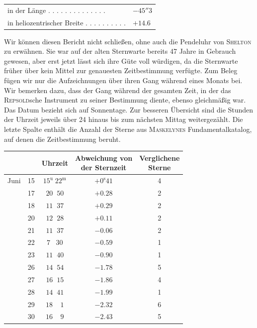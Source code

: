 \begin{center}
\begin{tabular}{ll}
in der Länge . . . . . . . . . . . . . . & $-45''3$ \\
in heliozentrischer Breite . . . . . . . . . . & $+14.6$ \\
\end{tabular}
\end{center}

\par\indent Wir können diesen Bericht nicht schließen, ohne auch die Pendeluhr von \textsc{Shelton} zu erwähnen. Sie war auf der alten Sternwarte bereits 47 Jahre in Gebrauch gewesen, aber erst jetzt lässt sich ihre Güte voll würdigen, da die Sternwarte früher über kein Mittel zur genauesten Zeitbestimmung verfügte. Zum Beleg fügen wir nur die Aufzeichnungen über ihren Gang während eines Monats bei. Wir bemerken dazu, dass der Gang während der gesamten Zeit, in der das \textsc{Repsold}sche Instrument zu seiner Bestimmung diente, ebenso gleichmäßig war. Das Datum bezieht sich auf Sonnentage. Zur besseren Übersicht sind die Stunden der Uhrzeit jeweils über 24 hinaus bis zum nächsten Mittag weitergezählt. Die letzte Spalte enthält die Anzahl der Sterne aus \textsc{Maskelynes} Fundamentalkatalog, auf denen die Zeitbestimmung beruht.

\begin{center}
\begin{tabular}{ll|c|c|c}
 & & Uhrzeit & \shortstack{Abweichung von\\der Sternzeit} & \shortstack{Verglichene\\Sterne} \\
\hline
Juni & 15 & $15^{\mathrm u}\;22^{\mathrm m}$ & $+0^{\mathrm s}41$ & 4 \\
 & 17 & $20\;\;50$ & $+0.28$ & 2 \\
 & 18 & $11\;\;37$ & $+0.29$ & 2 \\
 & 20 & $12\;\;28$ & $+0.11$ & 2 \\
 & 21 & $11\;\;37$ & $-0.06$ & 2 \\
 & 22 & $7\;\;\;30$ & $-0.59$ & 1 \\
 & 23 & $11\;\;40$ & $-0.90$ & 1 \\
 & 26 & $14\;\;54$ & $-1.78$ & 5 \\
 & 27 & $16\;\;15$ & $-1.86$ & 4 \\
 & 28 & $14\;\;41$ & $-1.99$ & 1 \\
 & 29 & $18\;\;\;\;1$ & $-2.32$ & 6 \\
 & 30 & $16\;\;\;\;9$ & $-2.43$ & 5 \\
\end{tabular}
\end{center}

